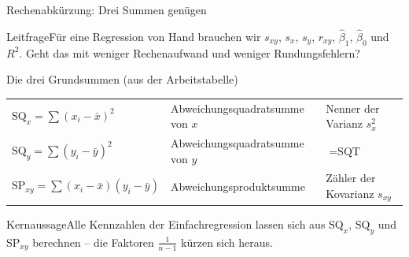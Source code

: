 \documentclass[aspectratio=169,11pt]{beamer}
\newcommand{\kernaussage}[1]{\begin{alertblock}{Kernaussage}#1\end{alertblock}}
\newcommand{\leitfrage}[1]{\begin{exampleblock}{Leitfrage}#1\end{exampleblock}}
\newcommand{\SQx}{\text{SQ}_x}
\newcommand{\SQy}{\text{SQ}_y}
\newcommand{\SPxy}{\text{SP}_{xy}}
\begin{document}
\begin{frame}{Rechenabkürzung: Drei Summen genügen}
  \leitfrage{Für eine Regression von Hand brauchen wir $s_{xy}$, $s_x$, $s_y$,
    $r_{xy}$, $\hat{\beta}_1$, $\hat{\beta}_0$ und $R^{2}$. Geht das mit weniger
    Rechenaufwand und weniger Rundungsfehlern?}

  \begin{block}{Die drei Grundsummen (aus der Arbeitstabelle)}
    \renewcommand{\arraystretch}{1.35}
    \begin{tabular}{@{}l l l@{}}
      $\SQx = \sum (x_i - \bar{x})^{2}$ & Abweichungsquadratsumme von $x$ & Nenner der Varianz $s_x^{2}$ \\
      $\SQy = \sum (y_i - \bar{y})^{2}$ & Abweichungsquadratsumme von $y$ & $= \text{SQT}$ \\
      $\SPxy = \sum (x_i - \bar{x})(y_i - \bar{y})$ & Abweichungsproduktsumme & Zähler der Kovarianz $s_{xy}$
    \end{tabular}
  \end{block}

  \kernaussage{Alle Kennzahlen der Einfachregression lassen sich aus $\SQx$, $\SQy$
    und $\SPxy$ berechnen -- die Faktoren $\frac{1}{n-1}$ kürzen sich heraus.}
\end{frame}
\end{document}
